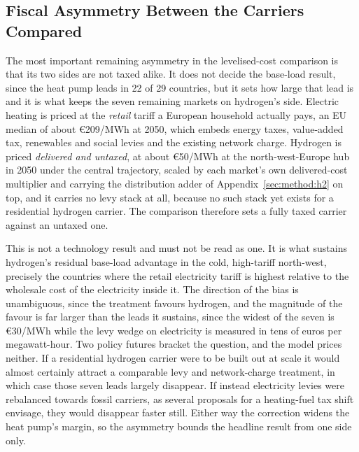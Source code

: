 \subsection{Fiscal Asymmetry Between the Carriers Compared}
The most important remaining asymmetry in the levelised-cost comparison is that its
two sides are not taxed alike. It does not decide the base-load result, since the heat pump leads in 22 of 29 countries, but it sets how large that lead is and it
is what keeps the seven remaining markets on hydrogen's side. Electric heating is priced at the \emph{retail}
tariff a European household actually pays, an EU median of about \euro{}209/MWh at 2050, which embeds energy taxes, value-added tax, renewables and
social levies and the existing network charge. Hydrogen is priced
\emph{delivered and untaxed}, at about \euro{}50/MWh at the north-west-Europe hub in
2050 under the central trajectory, scaled by each market's own delivered-cost
multiplier and carrying the distribution adder of
Appendix~\ref{sec:method:h2} on top, and it carries no levy stack at all, because no such
stack yet exists for a residential hydrogen carrier. The comparison therefore sets
a fully taxed carrier against an untaxed one.

This is not a technology result and must not be read as one. It is what sustains
hydrogen's residual base-load advantage in the cold, high-tariff north-west,
precisely the countries where the retail electricity tariff is highest
relative to the wholesale cost of the electricity inside it. The direction of the
bias is unambiguous, since the treatment favours hydrogen, and the magnitude of the
favour is far larger than the leads it sustains, since the widest of the seven is
\euro{}30/MWh while the levy wedge on electricity is measured in tens of euros per
megawatt-hour. Two policy futures bracket the
question, and the model prices neither. If a residential hydrogen carrier were to
be built out at scale it would almost certainly attract a comparable levy and
network-charge treatment, in which case those seven leads largely disappear.
If instead electricity levies were rebalanced towards fossil carriers, as several
proposals for a heating-fuel tax shift envisage, they would disappear faster still.
Either way the correction widens the heat pump's margin, so the asymmetry bounds
the headline result from one side only.

